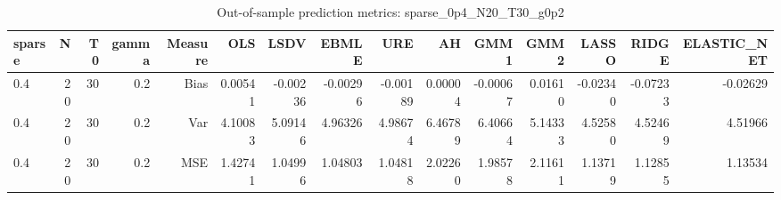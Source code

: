 \begin{table}[!htbp]\centering
\caption{Out-of-sample prediction metrics: sparse_0p4_N20_T30_g0p2}
\label{tab:table3_sparse_0p4_N20_T30_g0p2}
\begin{tabular}{lrrrrrrrrrrrrrr}
\hline
sparse & N & T0 & gamma & Measure & OLS & LSDV & EBMLE & URE & AH & GMM1 & GMM2 & LASSO & RIDGE & ELASTIC_NET \\
\hline
0.4 & 20 & 30 & 0.2 & Bias & 0.00541 & -0.00236 & -0.00296 & -0.00189 & 0.00004 & -0.00067 & 0.01610 & -0.02340 & -0.07233 & -0.02629 \\
0.4 & 20 & 30 & 0.2 & Var & 4.10083 & 5.09146 & 4.96326 & 4.98674 & 6.46789 & 6.40664 & 5.14333 & 4.52580 & 4.52469 & 4.51966 \\
0.4 & 20 & 30 & 0.2 & MSE & 1.42741 & 1.04996 & 1.04803 & 1.04818 & 2.02260 & 1.98578 & 2.11611 & 1.13719 & 1.12855 & 1.13534 \\
\hline
\end{tabular}
\end{table}

